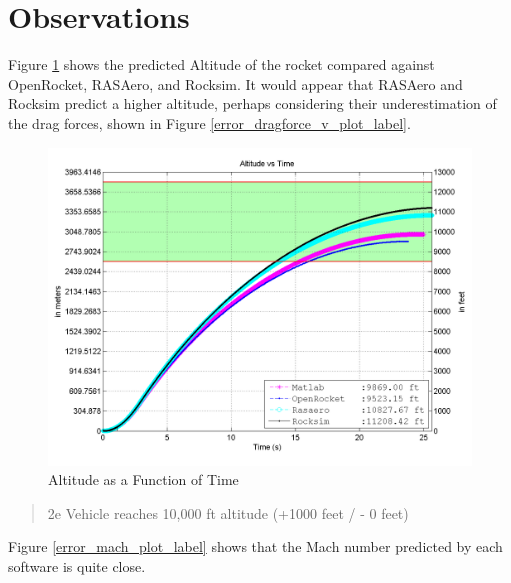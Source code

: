 \documentclass[]{book}
\begin{document}
\clearpage

\section{Observations}\label{observations}

Figure \ref{error_altitude_plot_label} shows the predicted Altitude of
the rocket compared against OpenRocket, RASAero, and Rocksim. It would
appear that RASAero and Rocksim predict a higher altitude, perhaps
considering their underestimation of the drag forces, shown in Figure
\ref{error_dragforce_v_plot_label}.

\begin{figure}[htbp]
\centering
\includegraphics{images/plots/error_altitude_plot.png}
\caption{Altitude as a Function of Time
\label{error_altitude_plot_label}}
\end{figure}

\begin{quote}
2e Vehicle reaches 10,000 ft altitude (+1000 feet / - 0 feet)
\end{quote}

\clearpage

Figure \ref{error_mach_plot_label} shows that the Mach number predicted
by each software is quite close.
\end{document}
